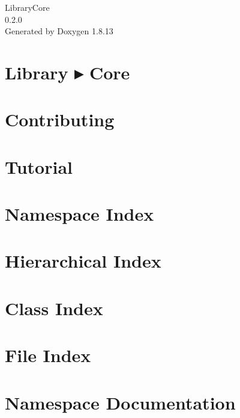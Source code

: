 \documentclass[twoside]{book}
\newcommand{\+}{\discretionary{\mbox{\scriptsize$\hookleftarrow$}}{}{}}
\newcommand{\clearemptydoublepage}{%
  \newpage{\pagestyle{empty}\cleardoublepage}%
}
\begin{document}
\hypersetup{pageanchor=false,
             bookmarksnumbered=true,
             pdfencoding=unicode
            }
\begin{titlepage}
\vspace*{7cm}
\begin{center}%
{\Large Library\+Core \\[1ex]\large 0.\+2.\+0 }\\
\vspace*{1cm}
{\large Generated by Doxygen 1.8.13}\\
\end{center}
\end{titlepage}
\clearemptydoublepage
{}
\tableofcontents
\clearemptydoublepage
{}
\hypersetup{pageanchor=true}

\chapter{Library ▸ Core}
\label{index}\hypertarget{index}{}
\chapter{Contributing}
\label{md__c_o_n_t_r_i_b_u_t_i_n_g}

\chapter{Tutorial}
\label{md_docs__tutorial}

\chapter{Namespace Index}

\chapter{Hierarchical Index}

\chapter{Class Index}

\chapter{File Index}

\chapter{Namespace Documentation}














\end{document}
